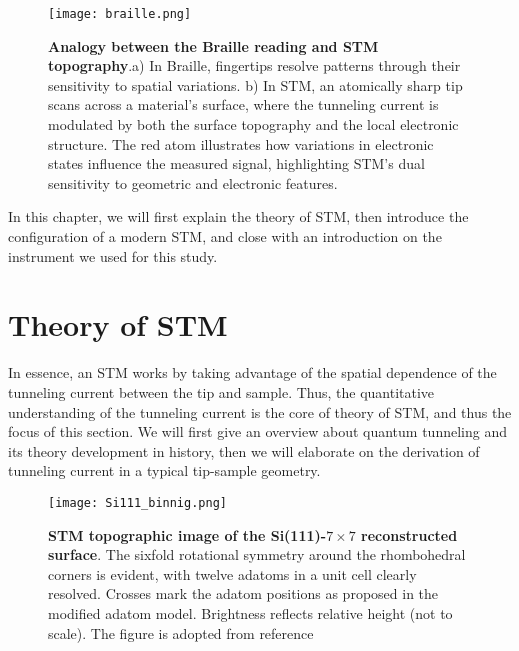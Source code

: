 \begin{figure}
	\centering
	\texttt{[image: braille.png]}
	\caption[\textbf{Analogy between the Braille reading and STM topography}]{\textbf{Analogy between the Braille reading and STM topography}.a) In Braille, fingertips resolve patterns through their sensitivity to spatial variations. b) In STM, an atomically sharp tip scans across a material’s surface, where the tunneling current is modulated by both the surface topography and the local electronic structure. The red atom illustrates how variations in electronic states influence the measured signal, highlighting STM’s dual sensitivity to geometric and electronic features.}
	\label{fig:braille}
\end{figure}

In this chapter, we will first explain the theory of \ac{STM}, then introduce the configuration of a modern \ac{STM}, and close with an introduction on the instrument we used for this study. 


\section{Theory of STM}
In essence, an \ac{STM} works by taking advantage of the spatial dependence of the tunneling current between the tip and sample. Thus, the quantitative understanding of the tunneling current is the core of theory of \ac{STM}, and thus the focus of this section. We will first give an overview about quantum tunneling and its theory development in history, then we will elaborate on the derivation of tunneling current in a typical tip-sample geometry.

\begin{figure}
	\centering
	\texttt{[image: Si111\_binnig.png]}
	\caption[\textbf{STM topographic image of the Si(111)-$7 \times 7$ reconstructed surface}]{\textbf{STM topographic image of the Si(111)-$7 \times 7$ reconstructed surface}. The sixfold rotational symmetry around the rhombohedral corners is evident, with twelve adatoms in a unit cell clearly resolved. Crosses mark the adatom positions as proposed in the modified adatom model. Brightness reflects relative height (not to scale). The figure is adopted from reference \cite{binnig77Reconstruction1983}}
	\label{figure:si111_binnig}
\end{figure}

